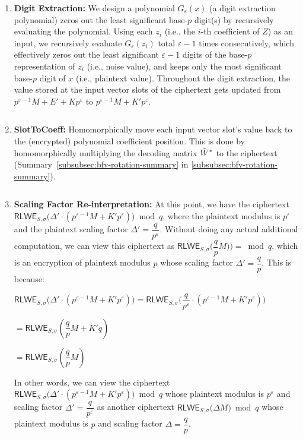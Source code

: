 \begin{enumerate}
\item \textbf{Digit Extraction:} We design a polynomial $G_\varepsilon(x)$ (a digit extraction polynomial) zeros out the least significant base-$p$  digit(s) by recursively evaluating the polynomial. Using each $z_i$ (i.e., the $i$-th coefficient of $Z$) as an input, we recursively evaluate $G_\varepsilon(z_i)$ total $\varepsilon-1$ times consecutively, which effectively zeros out the least significant $\varepsilon-1$ digits of the base-$p$ representation of $z_i$ (i.e., noise value), and keeps only the most significant base-$p$ digit of $x$ (i.e., plaintext value). Throughout the digit extraction, the value stored at the input vector slots of the ciphertext gets updated from $p^{\varepsilon-1} M  + E' + Kp^\varepsilon$ to $p^{\varepsilon-1}M  + K'p^\varepsilon$. 


$ $


\item \textbf{\textsf{SlotToCoeff}:} Homomorphically move each input vector slot's value back to the (encrypted) polynomial coefficient position. This is done by homomorphically multiplying the decoding matrix $\tilde{W}^*$ to the ciphertext (Summary~\ref*{subsubsec:bfv-rotation-summary} in \autoref{subsubsec:bfv-rotation-summary}).


$ $


\item \textbf{Scaling Factor Re-interpretation:} At this point, we have the ciphertext $\textsf{RLWE}_{S, \sigma}\bm(\Delta' \cdot (p^{\varepsilon-1}M + K'p^\varepsilon)\bm) \bmod q$, where the plaintext modulus is $p^\varepsilon$ and the plaintext scaling factor $\Delta' = \dfrac{q}{p^\varepsilon}$. Without doing any actual additional computation, we can view this ciphertext as $\textsf{RLWE}_{S, \sigma}\bm(\dfrac{q}{p}M)\bm) = \bmod q$, which is an encryption of plaintext modulus $p$ whose scaling factor $\Delta' = \dfrac{q}{p}$. This is because:

$\textsf{RLWE}_{S, \sigma}\bm(\Delta' \cdot (p^{\varepsilon-1}M + K'p^\varepsilon) \bm) = \textsf{RLWE}_{S, \sigma}\bm{\Big(}\dfrac{q}{p^\varepsilon} \cdot (p^{\varepsilon-1}M + K'p^\varepsilon) \bm{\Big)}$

$ = \textsf{RLWE}_{S, \sigma}\left(\dfrac{q}{p}M + K'q \right)$

$ = \textsf{RLWE}_{S, \sigma}\left(\dfrac{q}{p}M \right)$


In other words, we can view the ciphertext $ \textsf{RLWE}_{S, \sigma}\bm(\Delta' \cdot (p^{\varepsilon-1} M + K'p^\varepsilon )\bm) \bmod q$ whose plaintext modulus is $p^\varepsilon$ and scaling factor $\Delta' = \dfrac{q}{p^\varepsilon}$ as another ciphertext $ \textsf{RLWE}_{S, \sigma}\bm(\Delta M \bm) \bmod q$ whose plaintext modulus is $p$ and scaling factor $\Delta = \dfrac{q}{p}$. 




\end{enumerate}

